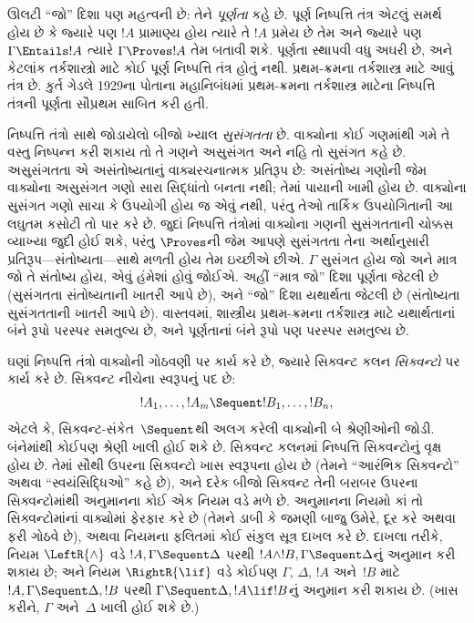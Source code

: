 ઊલટી ``જો'' દિશા પણ મહત્વની છે: તેને \emph{પૂર્ણતા} કહે છે. પૂર્ણ
નિષ્પત્તિ તંત્ર એટલું સમર્થ હોય છે કે જ્યારે પણ $!A$ પ્રામાણ્ય
હોય ત્યારે તે $!A$ પ્રમેય છે તેમ અને જ્યારે પણ $\Gamma \Entails !A$
ત્યારે $\Gamma \Proves !A$ તેમ બતાવી શકે. પૂર્ણતા સ્થાપવી વધુ અઘરી
છે, અને કેટલાંક તર્કશાસ્ત્રો માટે કોઈ પૂર્ણ નિષ્પત્તિ તંત્ર હોતું
નથી. પ્રથમ-ક્રમના તર્કશાસ્ત્ર માટે આવું તંત્ર છે. કુર્ત ગેડલે 1929ના
પોતાના મહાનિબંધમાં પ્રથમ-ક્રમના તર્કશાસ્ત્ર માટેના નિષ્પત્તિ
તંત્રની પૂર્ણતા સૌપ્રથમ સાબિત કરી હતી.

નિષ્પત્તિ તંત્રો સાથે જોડાયેલો બીજો ખ્યાલ \emph{સુસંગતતા} છે.
વાક્યોના કોઈ ગણમાંથી ગમે તે વસ્તુ નિષ્પન્ન કરી શકાય તો તે
ગણને અસુસંગત અને નહિ તો સુસંગત કહે છે. અસુસંગતતા એ અસંતોષ્યતાનું
વાક્યરચનાત્મક પ્રતિરૂપ છે: અસંતોષ્ય ગણોની જેમ વાક્યોના
અસુસંગત ગણો સારા સિદ્ધાંતો બનતા નથી; તેમાં પાયાની ખામી હોય છે.
વાક્યોના સુસંગત ગણો સાચા કે ઉપયોગી હોય જ એવું નથી, પરંતુ
તેઓ તાર્કિક ઉપયોગિતાની આ લઘુતમ કસોટી તો પાર કરે છે. જુદાં
નિષ્પત્તિ તંત્રોમાં વાક્યોના ગણની સુસંગતતાની ચોક્કસ વ્યાખ્યા
જુદી હોઈ શકે, પરંતુ $\Proves$ની જેમ આપણે સુસંગતતા તેના અર્થાનુસારી
પ્રતિરૂપ—સંતોષ્યતા—સાથે મળતી હોય તેમ ઇચ્છીએ છીએ. $\Gamma$ સુસંગત હોય
જો અને માત્ર જો તે સંતોષ્ય હોય, એવું હંમેશાં હોવું જોઈએ. અહીં ``માત્ર
જો'' દિશા પૂર્ણતા જેટલી છે (સુસંગતતા સંતોષ્યતાની ખાતરી આપે છે), અને
``જો'' દિશા યથાર્થતા જેટલી છે (સંતોષ્યતા સુસંગતતાની ખાતરી આપે છે).
વાસ્તવમાં, શાસ્ત્રીય પ્રથમ-ક્રમના તર્કશાસ્ત્ર માટે યથાર્થતાનાં બંને
રૂપો પરસ્પર સમતુલ્ય છે, અને પૂર્ણતાનાં બંને રૂપો પણ પરસ્પર સમતુલ્ય છે.
\endgroup


\begingroup
\makeatletter{}\makeatother


\label{guunit:OLP-0065}


ઘણાં નિષ્પત્તિ તંત્રો વાક્યોની ગોઠવણી પર કાર્ય કરે છે,
જ્યારે સિક્વન્ટ કલન \emph{સિક્વન્ટો} પર કાર્ય કરે છે. સિક્વન્ટ નીચેના
સ્વરૂપનું પદ છે:
\[
!A_1, \dots, !A_m \Sequent !B_1, \dots, !B_n,
\]
એટલે કે, સિક્વન્ટ-સંકેત~$\Sequent$થી અલગ કરેલી વાક્યોની બે
શ્રેણીઓની જોડી. બંનેમાંથી કોઈપણ શ્રેણી ખાલી હોઈ શકે છે. સિક્વન્ટ કલનમાં
નિષ્પત્તિ સિક્વન્ટોનું વૃક્ષ હોય છે. તેમાં સૌથી ઉપરના સિક્વન્ટો
ખાસ સ્વરૂપના હોય છે (તેમને ``આરંભિક સિક્વન્ટો'' અથવા
``સ્વયંસિદ્ધિઓ'' કહે છે), અને દરેક બીજો સિક્વન્ટ તેની બરાબર ઉપરના
સિક્વન્ટોમાંથી અનુમાનના કોઈ એક નિયમ વડે મળે છે. અનુમાનના નિયમો કાં તો
સિક્વન્ટોમાંનાં વાક્યોમાં ફેરફાર કરે છે (તેમને ડાબી કે જમણી
બાજુ ઉમેરે, દૂર કરે અથવા ફરી ગોઠવે છે), અથવા નિયમના ફલિતમાં કોઈ
સંકુલ સૂત્ર દાખલ કરે છે. દાખલા તરીકે, નિયમ $\LeftR{\land}$ વડે
$!A, \Gamma \Sequent \Delta$ પરથી $!A \land !B, \Gamma \Sequent
\Delta$નું અનુમાન કરી શકાય છે; અને નિયમ $\RightR{\lif}$ વડે કોઈપણ
$\Gamma$, $\Delta$, $!A$ અને~$!B$ માટે $!A, \Gamma \Sequent \Delta,
!B$ પરથી $\Gamma \Sequent \Delta, !A \lif !B$નું અનુમાન કરી શકાય છે.
(ખાસ કરીને, $\Gamma$ અને~$\Delta$ ખાલી હોઈ શકે છે.)

